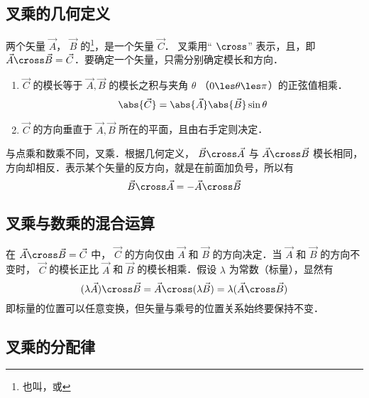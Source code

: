 

\subsection{叉乘的几何定义}
两个矢量 $\vec A$，  $\vec B$ 的\footnote{也叫，或}，是一个矢量 $\vec C$．  叉乘用“ $\cross$” 表示，且，即 $ \vec A \cross \vec B = \vec C$．要确定一个矢量，只需分别确定模长和方向．

\begin{enumerate}
\item $\vec C$ 的模长等于 $\vec A, \vec B$ 的模长之积与夹角 $\theta$ （$0 \les \theta \les \pi$）的正弦值相乘．
\begin{equation}\label{Cross_eq1}
\abs{\vec C}  = \abs{\vec A} \abs{\vec B} \sin\theta 
\end{equation}
\item $\vec C$ 的方向垂直于 $\vec A, \vec B$ 所在的平面，且由右手定则决定．
\end{enumerate}

与点乘和数乘不同，叉乘．根据几何定义， $\vec B \cross \vec A$ 与 $\vec A \cross \vec B$ 模长相同，方向却相反．表示某个矢量的反方向，就是在前面加负号，所以有
\begin{equation}\label{Cross_eq11}
\vec B \cross \vec A = -\vec A \cross \vec B
\end{equation}

\subsection{叉乘与数乘的混合运算}

在 $\vec A \cross \vec B = \vec C$ 中， $\vec C$ 的方向仅由 $\vec A$ 和 $\vec B$ 的方向决定．当 $\vec A$ 和 $\vec B$ 的方向不变时， $\vec C$ 的模长正比 $\vec A$ 和 $\vec B$ 的模长相乘．假设 $\lambda $ 为常数（标量），显然有
\begin{equation}
(\lambda \vec A) \cross \vec B = \vec A \cross (\lambda \vec B) = \lambda (\vec A \cross \vec B)
\end{equation}
即标量的位置可以任意变换，但矢量与乘号的位置关系始终要保持不变．

\subsection{叉乘的分配律}

